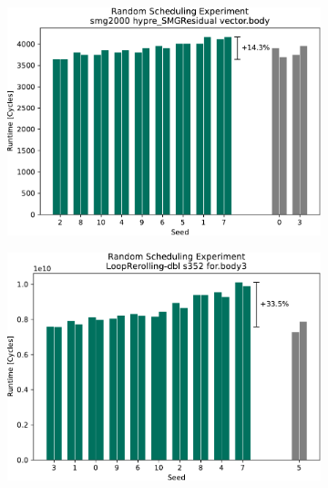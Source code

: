 \begin{figure}
    \vspace{0.5cm}
    \begin{subfigure}{0.0325\textwidth}\caption{}\label{fig:eval:rndm:aarch64:c}\end{subfigure}
    \begin{subfigure}{0.44\textwidth}
        \includegraphics[width=\textwidth]{img/random-scheduling-experiment-pi-collected/smg2000-crop.pdf}
    \end{subfigure}
    \hfill
    \begin{subfigure}{0.0325\textwidth}\caption{}\label{fig:eval:rndm:aarch64:d}\end{subfigure}
    \begin{subfigure}{0.44\textwidth}
        \includegraphics[width=\textwidth]{img/random-scheduling-experiment-pi-collected/LoopRerolling-dbl-crop.pdf}
    \end{subfigure}


\end{figure}
